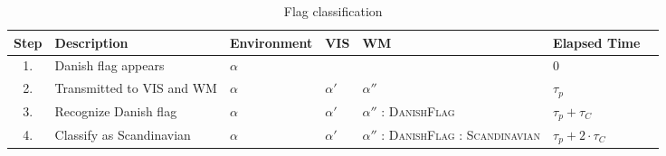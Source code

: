 \begin{table}
{\footnotesize\centering
\begin{tabular}{cllllll}
\toprule
Step & Description                    & Environment & VIS       & WM                                                       & Elapsed Time              \\
\midrule
1.   & Danish flag appears            & $\alpha$    &           &                                                          & 0                         \\
2.   & Transmitted to \ac{VIS} and WM & $\alpha$    & $\alpha'$ & $\alpha''$                                               & $\tau_p$                  \\
3.   & Recognize Danish flag          & $\alpha$    & $\alpha'$ & $\alpha''$ : \textsc{DanishFlag}                         & $\tau_p + \tau_C$         \\
4.   & Classify as Scandinavian       & $\alpha$    & $\alpha'$ & $\alpha''$ : \textsc{DanishFlag} : \textsc{Scandinavian} & $\tau_p + 2 \cdot \tau_C$ \\
\bottomrule
\end{tabular}
}
\caption{Flag classification}
\label{tab:b}
\end{table}

